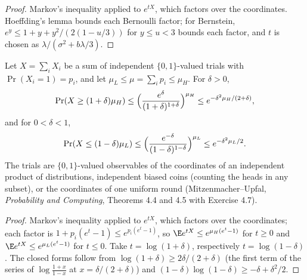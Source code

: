 \begin{proof}\leanok
Markov's inequality applied to $e^{tX}$, which factors over the coordinates.
Hoeffding's lemma bounds each Bernoulli factor; for Bernstein,
$e^y\le1+y+y^2/(2(1-u/3))$ for $y\le u<3$ bounds each factor, and $t$ is
chosen as $\lambda/(\sigma^2+b\lambda/3)$.
\end{proof}
\begin{theorem}\label{thm:chernoff}
\leanok{}
Let $X=\sum_iX_i$ be a sum of independent $\{0,1\}$-valued trials with
$\Pr(X_i=1)=p_i$, and let $\mu_L\le\mu=\sum_ip_i\le\mu_H$. For $\delta>0$,
\[\Pr(X\ge(1+\delta)\mu_H)\le\Bigl(\frac{e^{\delta}}{(1+\delta)^{1+\delta}}\Bigr)^{\mu_H}
\le e^{-\delta^2\mu_H/(2+\delta)},\]
and for $0<\delta<1$,
\[\Pr(X\le(1-\delta)\mu_L)\le\Bigl(\frac{e^{-\delta}}{(1-\delta)^{1-\delta}}\Bigr)^{\mu_L}
\le e^{-\delta^2\mu_L/2}.\]
The trials are $\{0,1\}$-valued observables of the coordinates of an independent
product of distributions, independent biased coins (counting the heads in any
subset), or the coordinates of one uniform round (Mitzenmacher--Upfal,
\emph{Probability and Computing}, Theorems 4.4 and 4.5 with Exercise 4.7).
\end{theorem}
\begin{proof}\leanok
Markov's inequality applied to $e^{tX}$, which factors over the coordinates; each
factor is $1+p_i(e^t-1)\le e^{p_i(e^t-1)}$, so $\E e^{tX}\le e^{\mu_H(e^t-1)}$ for
$t\ge0$ and $\E e^{tX}\le e^{\mu_L(e^t-1)}$ for $t\le0$. Take $t=\log(1+\delta)$,
respectively $t=\log(1-\delta)$. The closed forms follow from
$\log(1+\delta)\ge2\delta/(2+\delta)$ (the first term of the series of
$\log\frac{1+x}{1-x}$ at $x=\delta/(2+\delta)$) and
$(1-\delta)\log(1-\delta)\ge-\delta+\delta^2/2$.
\end{proof}
